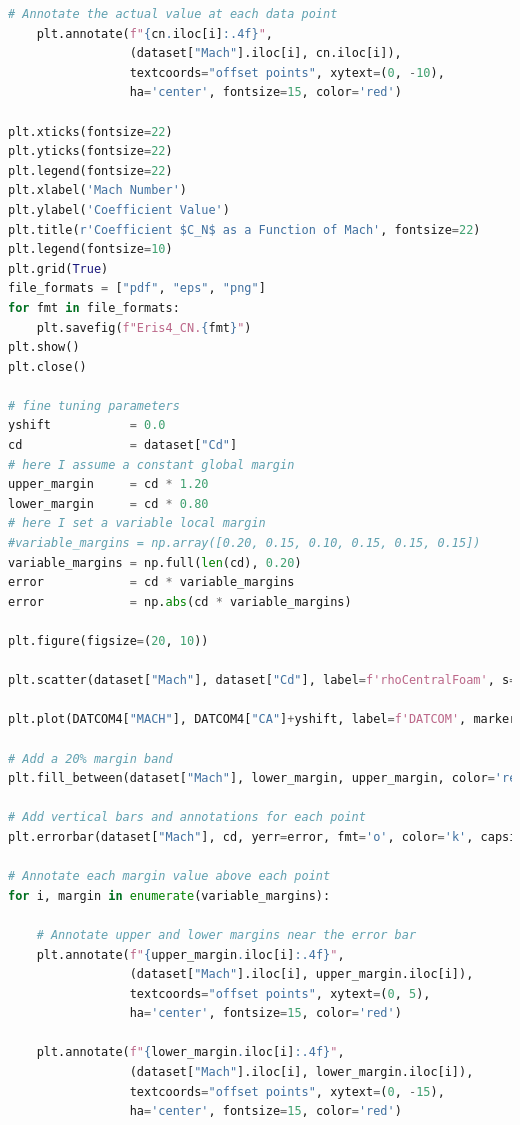 \documentclass[12pt]{article}
\begin{document}
\begin{lstlisting}[language=Python, caption=Python script used to post-process numerical solutions. To report bugs email to: lorenzo.campoli@gspace.com, label=lst:pp]
   # Annotate the actual value at each data point
    plt.annotate(f"{cn.iloc[i]:.4f}", 
                 (dataset["Mach"].iloc[i], cn.iloc[i]), 
                 textcoords="offset points", xytext=(0, -10),
                 ha='center', fontsize=15, color='red')

plt.xticks(fontsize=22)
plt.yticks(fontsize=22)
plt.legend(fontsize=22)
plt.xlabel('Mach Number')
plt.ylabel('Coefficient Value')
plt.title(r'Coefficient $C_N$ as a Function of Mach', fontsize=22)
plt.legend(fontsize=10)
plt.grid(True)
file_formats = ["pdf", "eps", "png"]
for fmt in file_formats:
    plt.savefig(f"Eris4_CN.{fmt}")
plt.show()
plt.close()

# fine tuning parameters
yshift           = 0.0
cd               = dataset["Cd"]
# here I assume a constant global margin
upper_margin     = cd * 1.20 
lower_margin     = cd * 0.80  
# here I set a variable local margin
#variable_margins = np.array([0.20, 0.15, 0.10, 0.15, 0.15, 0.15])
variable_margins = np.full(len(cd), 0.20)
error            = cd * variable_margins 
error            = np.abs(cd * variable_margins) 

plt.figure(figsize=(20, 10))

plt.scatter(dataset["Mach"], dataset["Cd"], label=f'rhoCentralFoam', s=200, marker='p', color='g', linestyle='dotted')

plt.plot(DATCOM4["MACH"], DATCOM4["CA"]+yshift, label=f'DATCOM', marker='p', linestyle=':', color='gray')

# Add a 20% margin band
plt.fill_between(dataset["Mach"], lower_margin, upper_margin, color='red', alpha=0.2, label='20% Margin Band')

# Add vertical bars and annotations for each point
plt.errorbar(dataset["Mach"], cd, yerr=error, fmt='o', color='k', capsize=10, label='Local Margin')

# Annotate each margin value above each point
for i, margin in enumerate(variable_margins):
   
    # Annotate upper and lower margins near the error bar
    plt.annotate(f"{upper_margin.iloc[i]:.4f}", 
                 (dataset["Mach"].iloc[i], upper_margin.iloc[i]), 
                 textcoords="offset points", xytext=(0, 5),
                 ha='center', fontsize=15, color='red')
    
    plt.annotate(f"{lower_margin.iloc[i]:.4f}", 
                 (dataset["Mach"].iloc[i], lower_margin.iloc[i]), 
                 textcoords="offset points", xytext=(0, -15),
                 ha='center', fontsize=15, color='red')


\end{lstlisting}
\end{document}

